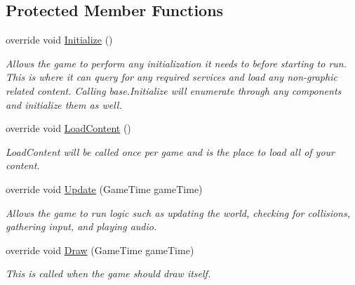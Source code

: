 \subsection*{Protected Member Functions}
\begin{DoxyCompactItemize}
\item 
override void \hyperlink{classXaria_1_1Game1_a7510c981afe40f31d24c551b7cc73046}{Initialize} ()
\begin{DoxyCompactList}\small\item\em Allows the game to perform any initialization it needs to before starting to run. This is where it can query for any required services and load any non-\/graphic related content. Calling base.\+Initialize will enumerate through any components and initialize them as well. \end{DoxyCompactList}\item 
override void \hyperlink{classXaria_1_1Game1_a4593eda6c63d3242f6544e2357a08431}{Load\+Content} ()
\begin{DoxyCompactList}\small\item\em Load\+Content will be called once per game and is the place to load all of your content. \end{DoxyCompactList}\item 
override void \hyperlink{classXaria_1_1Game1_a650e782700008533feec6ae84c19536a}{Update} (Game\+Time game\+Time)
\begin{DoxyCompactList}\small\item\em Allows the game to run logic such as updating the world, checking for collisions, gathering input, and playing audio. \end{DoxyCompactList}\item 
override void \hyperlink{classXaria_1_1Game1_a5dce3a85b3eba6685d04d309bcd6e1c0}{Draw} (Game\+Time game\+Time)
\begin{DoxyCompactList}\small\item\em This is called when the game should draw itself. \end{DoxyCompactList}\end{DoxyCompactItemize}

